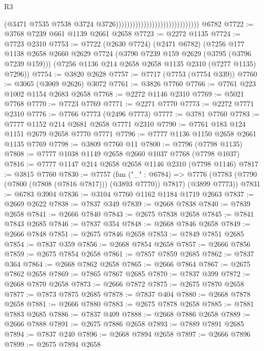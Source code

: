 \begin{lexlean}{R3}
\begin{coremodule}
                                                              (@3471
                                                                @7535
                                                                @7538
                                                                @3724
                                                                @3726))))))))))))))))))))))))))))))
    @6782
@7722 := @3768 @7239 @661 @1139 @2661 @2658
@7723 := @2272 @1135
@7724 := @7723 @2310
@7753 := @7722
    (@2630 @7724)
    (@2471 @6782)
    (@7256
      @177
      @1138
      @2658
      @2660
      @2629
      @7724
      (@3790 @7239 @159 @2629 (@3795 (@3796 @7239 @159)))
      (@7256 @1136 @214 @2658 @2658 @1135 @2310 (@7277 @1135) @7296))
@7754 := @3820 @2628
@7757 := @7717 (@7753 (@7754 @339))
@7760 := @3065 (@3069 @2626) @3072
@7761 := @3826 @7760
@7766 := @7761 @223 @1002 @1154 @2683 @2658
@7768 := @2272 @1146 @2310
@7769 := @5021 @7768
@7770 := @7723 @7769
@7771 := @2271 @7770
@7773 := @2272 @7771 @2310
@7776 := @7766 @7773 (@2496 @7773)
@7777 := @3781 @7760
@7783 := @7777 @1152 @214 @2681 @2658 @7771 @2310
@7790 := @7761 @183 @124 @1151 @2679 @2658 @7770 @7771
@7796 := @7777 @1136 @1150 @2658 @2661 @1135 @7769
@7798 := @3809 @7760 @11
@7800 := @7796 (@7798 @1135)
@7808 := @7777 @1038 @1149 @2658 @2660 @1037 @7768 (@7798 @1037)
@7816 := @7777 @1147 @214 @2658 @2658 @1146 @2310 (@7798 @1146)
@7817 := @3815 @7760
@7830 := @7757
    (fun ("_" : @6784) =>
    @7776 (@7783 (@7790 (@7800 (@7808 (@7816 @7817))) (@3893 @7770)) @7817) (@3899 @7773))
@7831 := @6783 @3904
@7836 := @3104 @7760 @1162 @1184 @1719 @2663
@7837 := @2669 @2622
@7838 := @7837 @349
@7839 := @2668 @7838
@7840 := @7839 @2658
@7841 := @2666 @7840
@7843 := @2675 @7838 @2658
@7845 := @7841 @7843 @2685
@7846 := @7837 @354
@7848 := @2668 @7846 @2658
@7849 := @2666 @7848
@7851 := @2675 @7846 @2658
@7853 := @7849 @7851 @2685
@7854 := @7837 @359
@7856 := @2668 @7854 @2658
@7857 := @2666 @7856
@7859 := @2675 @7854 @2658
@7861 := @7857 @7859 @2685
@7862 := @7837 @364
@7864 := @2668 @7862 @2658
@7865 := @2666 @7864
@7867 := @2675 @7862 @2658
@7869 := @7865 @7867 @2685
@7870 := @7837 @399
@7872 := @2668 @7870 @2658
@7873 := @2666 @7872
@7875 := @2675 @7870 @2658
@7877 := @7873 @7875 @2685
@7878 := @7837 @404
@7880 := @2668 @7878 @2658
@7881 := @2666 @7880
@7883 := @2675 @7878 @2658
@7885 := @7881 @7883 @2685
@7886 := @7837 @409
@7888 := @2668 @7886 @2658
@7889 := @2666 @7888
@7891 := @2675 @7886 @2658
@7893 := @7889 @7891 @2685
@7894 := @7837 @240
@7896 := @2668 @7894 @2658
@7897 := @2666 @7896
@7899 := @2675 @7894 @2658

\end{coremodule}
\end{lexlean}
